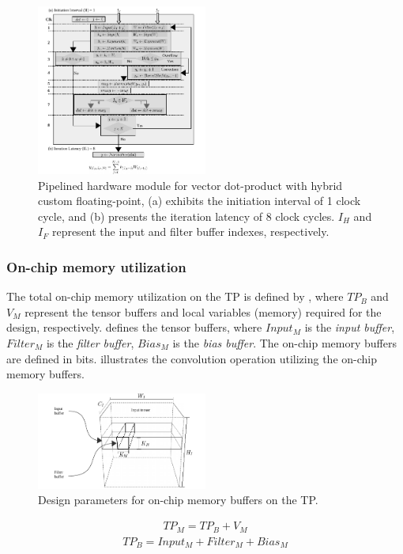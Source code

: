 \begin{figure}[t!]
	\centering
	\includegraphics[width=0.5\textwidth]{../figures/dot_product_hybrid.pdf}
	\caption{Pipelined hardware module for vector dot-product with hybrid custom floating-point, (a) exhibits the initiation interval of 1 clock cycle, and (b) presents
		the iteration latency of 8 clock cycles. $I_H$ and $I_F$ represent the input and filter buffer indexes, respectively.}
	\label{fig:dot_product_hybrid}
\end{figure}

\subsubsection{\textbf{On-chip memory utilization}}
\label{sec:memory_utilization}
The total on-chip memory utilization on the TP is defined by , where $TP_B$ and $V_{M}$ represent the tensor buffers and local variables (memory) required for the design, respectively.  defines the tensor buffers, where $Input_{M}$ is the \emph{input buffer}, $Filter_{M}$ is the \emph{filter buffer}, $Bias_{M}$ is the \emph{bias buffer}. The on-chip memory buffers are defined in bits.  illustrates the convolution operation utilizing the on-chip memory buffers.
\begin{figure}[t!]
	\centering
	\includegraphics[width=0.5\textwidth]{../figures/accelerator_buffers.pdf}
	\caption{Design parameters for on-chip memory buffers on the TP.}
	\label{fig:accelerator_buffers}
\end{figure}
\begin{eqnarray} \label{eq:tp_memory}
TP_{M}=TP_B+V_{M}
\end{eqnarray}
\begin{eqnarray} \label{eq:tp_memory_buffer}
TP_{B}=Input_{M}+Filter_{M}+Bias_{M}
\end{eqnarray}


